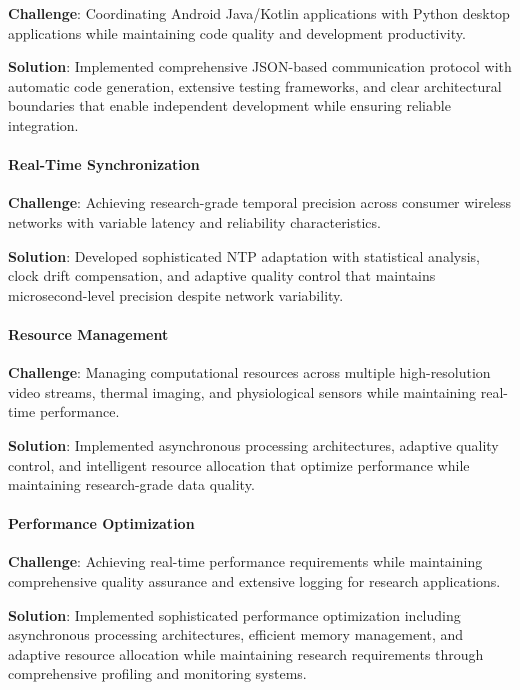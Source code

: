 \documentclass[12pt,a4paper]{report}
\begin{document}
\textbf{Challenge}: Coordinating Android Java/Kotlin applications with Python desktop applications while maintaining code
quality and development productivity.

\textbf{Solution}: Implemented comprehensive JSON-based communication protocol with automatic code generation, extensive
testing frameworks, and clear architectural boundaries that enable independent development while ensuring reliable
integration.

\paragraph{Real-Time Synchronization}

\textbf{Challenge}: Achieving research-grade temporal precision across consumer wireless networks with variable latency and
reliability characteristics.

\textbf{Solution}: Developed sophisticated NTP adaptation with statistical analysis, clock drift compensation, and adaptive
quality control that maintains microsecond-level precision despite network variability.

\paragraph{Resource Management}

\textbf{Challenge}: Managing computational resources across multiple high-resolution video streams, thermal imaging, and
physiological sensors while maintaining real-time performance.

\textbf{Solution}: Implemented asynchronous processing architectures, adaptive quality control, and intelligent resource
allocation that optimize performance while maintaining research-grade data quality.

\paragraph{Performance Optimization}

\textbf{Challenge}: Achieving real-time performance requirements while maintaining comprehensive quality assurance and
extensive logging for research applications.

\textbf{Solution}: Implemented sophisticated performance optimization including asynchronous processing architectures,
efficient memory management, and adaptive resource allocation while maintaining research requirements through
comprehensive profiling and monitoring systems.
\end{document}
